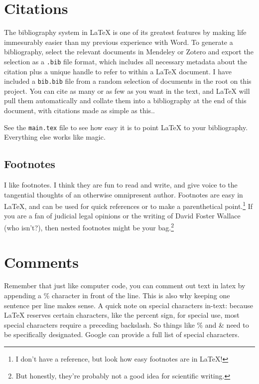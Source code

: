 \section{Citations}

The bibliography system in LaTeX is one of its greatest features by making life immesurably easier than my previous experience with Word. 
To generate a bibliography, select the relevant documents in Mendeley or Zotero and export the selection as a \texttt{.bib} file format, which includes all necessary metadata about the citation plus a unique handle to refer to within a LaTeX document.
I have included a \texttt{bib.bib} file from a random selection of documents in the root on this project.
You can cite as many or as few as you want in the text, and LaTeX will pull them automatically and collate them into a bibliography at the end of this document, with citations made as simple as this.\cite{Lin2017}.

See the \texttt{main.tex} file to see how easy it is to point LaTeX to your bibliography.
Everything else works like magic.

\subsection{Footnotes}

I like footnotes.
I think they are fun to read and write, and give voice to the tangential thoughts of an otherwise omnipresent author.
Footnotes are easy in LaTeX, and can be used for quick references or to make a parenthetical point.\footnote{I don't have a reference, but look how easy footnotes are in LaTeX!} 
If you are a fan of judicial legal opinions or the writing of David Foster Wallace (who isn't?), then nested footnotes might be your bag.\footnote{But honestly, they're probably not a good idea for scientific writing.\footnotemark}


\section{Comments}

Remember that just like computer code, you can comment out text in latex by appending a \% character in front of the line. 
This is also why keeping one sentence per line makes sense. 
A quick note on special characters in-text: because LaTeX reserves certain characters, like the percent sign, for special use, most special characters require a preceding backslash.
So things like \% and  \& need to be specifically designated. 
Google can provide a full list of special characters.

